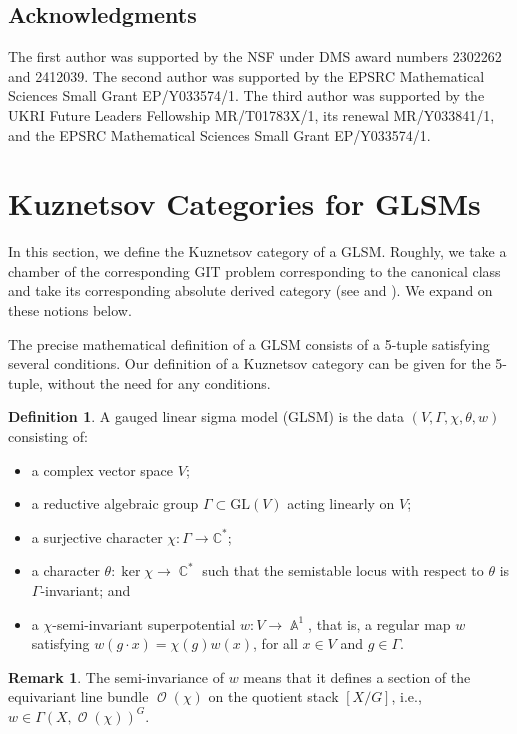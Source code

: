 \documentclass[reqno, 12pt]{amsart}
\theoremstyle{definition}
\newtheorem{definition}[theorem]{Definition}
\newtheorem{remark}[theorem]{Remark}
\newcommand{\op}[1]{\operatorname{#1}}
\newcommand{\newterm}{\textsf}
\def\ker{\op{\mbox{ker}}}
\def\C{\op{\mathbb{C}}}
\def\O{\op{\mathcal{O}}}
\def\A{\op{\mathbb{A}}}
\numberwithin{equation}{section}
\begin{document}
\subsection*{Acknowledgments}
The first author was supported by the NSF under DMS award numbers 2302262 and 2412039.
The second author was supported by the EPSRC Mathematical Sciences Small Grant EP/Y033574/1. The third author was supported by the UKRI Future Leaders Fellowship MR/T01783X/1, its renewal MR/Y033841/1, and the EPSRC Mathematical Sciences Small Grant EP/Y033574/1. 

\section{Kuznetsov Categories for GLSMs}

In this section, we define the Kuznetsov category of a GLSM.  Roughly, we take a chamber of the corresponding GIT problem corresponding to the canonical class and take its corresponding absolute derived category (see \cite{P11} and \cite[Definition 3.9]{BFK14a}).  We expand on these notions below.

The precise mathematical definition of a GLSM consists of a 5-tuple satisfying several conditions. Our definition of a Kuznetsov category can be given for the 5-tuple, without the need for any conditions.   

\begin{definition} \label{defn:glsm}
    A \newterm{gauged linear sigma model (GLSM)} is the data $(V, \Gamma, \chi, \theta, w)$ consisting of:
    \begin{itemize}
        \item a complex vector space $V$;
       \item a reductive algebraic group $\Gamma \subset \text{GL}(V)$ acting linearly on $V$;
       \item a surjective character $\chi: \Gamma \to \mathbb C^*$;
        \item a character $\theta: \ker \chi  \rightarrow \C^*$ such that the semistable locus with respect to $\theta$ is $\Gamma$-invariant; and
         \item a $\chi$-\newterm{semi-invariant superpotential} $w: V \rightarrow \A^1$, that is, a regular map $w$ satisfying $w(g \cdot x) = \chi(g)w(x)$, for all $x \in V$ and $g \in \Gamma$.
    \end{itemize}
\end{definition}

\begin{remark}
        The semi-invariance of $w$ means that it defines a section of the equivariant line bundle $\O(\chi)$ on the quotient stack $[X/G]$, i.e., $w\in \Gamma(X, \O(\chi))^G$.
\end{remark}
\end{document}
